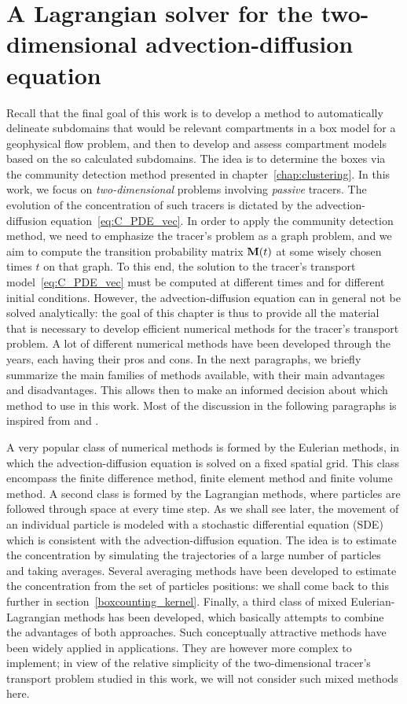 \chapter{A Lagrangian solver for the two-dimensional advection-diffusion equation} \label{chap:numerical}
Recall that the final goal of this work is to develop a method to automatically delineate subdomains that would be relevant compartments in a box model for a geophysical flow problem, and then to develop and assess compartment models based on the so calculated subdomains. The idea is to determine the boxes via the community detection method presented in chapter~\ref{chap:clustering}. In this work, we focus on \textit{two-dimensional} problems involving \textit{passive} tracers. The evolution of the concentration of such tracers is dictated by the advection-diffusion equation~\eqref{eq:C_PDE_vec}. In order to apply the community detection method, we need to emphasize the tracer's problem as a graph problem, and we aim to compute the transition probability matrix $\mathbf M(t)$ at some wisely chosen times $t$ on that graph. To this end, the solution to the tracer's transport model~\eqref{eq:C_PDE_vec} must be computed at different times and for different initial conditions. However, the advection-diffusion equation can in general not be solved analytically: the goal of this chapter is thus to provide all the material that is necessary to develop efficient numerical methods for the tracer's transport problem. A lot of different numerical methods have been developed through the years, each having their pros and cons. In the next paragraphs, we briefly summarize the main families of methods available, with their main advantages and disadvantages. This allows then to make an informed decision about which method to use in this work. Most of the discussion in the following paragraphs is inspired from \cite{spivakovskaya2007lagrangian} and \cite{spivakovskaya2007backward}. 

A very popular class of numerical methods is formed by the Eulerian methods, in which the advection-diffusion equation is solved on a fixed spatial grid. This class encompass the finite difference method, finite element method and finite volume method. A second class is formed by the Lagrangian methods, where particles are followed through space at every time step. As we shall see later, the movement of an individual particle is modeled with a stochastic differential equation (SDE) which is consistent with the advection-diffusion equation. The idea is to estimate the concentration by simulating the trajectories of a large number of particles and taking averages. Several averaging methods have been developed to estimate the concentration from the set of particles positions: we shall come back to this further in section~\ref{boxcounting_kernel}. Finally, a third class of mixed Eulerian-Lagrangian methods has been developed, which basically attempts to combine the advantages of both approaches. Such conceptually attractive methods have been widely applied in applications. They are however more complex to implement; in view of the relative simplicity of the two-dimensional tracer's transport problem studied in this work, we will not consider such mixed methods here.

